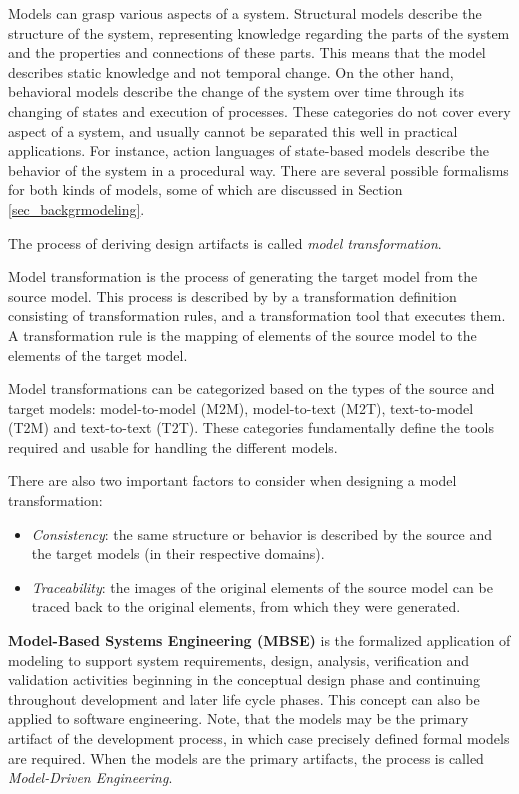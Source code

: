 Models can grasp various aspects of a system. Structural models describe the structure of the system, representing knowledge regarding the parts of the system and the properties and connections of these parts. This means that the model describes static knowledge and not temporal change. On the other hand, behavioral models describe the change of the system over time through its changing of states and execution of processes. These categories do not cover every aspect of a system, and usually cannot be separated this well in practical applications. For instance, action languages of state-based models describe the behavior of the system in a procedural way. There are several possible formalisms for both kinds of models, some of which are discussed in Section \ref{sec_backgrmodeling}.

The process of deriving design artifacts is called \textit{model transformation}.
\begin{definition}
	Model transformation is the process of generating the target model from the source model. This process is described by by a transformation definition consisting of transformation rules, and a transformation tool that executes them. A transformation rule is the mapping of elements of the source model to the elements of the target model. \cite{ModelTransformation}
\end{definition}

Model transformations can be categorized based on the types of the source and target models: model-to-model (M2M), model-to-text (M2T), text-to-model (T2M) and text-to-text (T2T). These categories fundamentally define the tools required and usable for handling the different models.

There are also two important factors to consider when designing a model transformation: 
\begin{itemize}
	\item \textit{Consistency}: the same structure or behavior is described by the source and the target models (in their respective domains).
	\item \textit{Traceability}: the images of the original elements of the source model can be traced back to the original elements, from which they were generated.
\end{itemize}

\textbf{Model-Based Systems Engineering (MBSE)} is the formalized application of modeling to support system requirements, design, analysis, verification and validation activities beginning in the conceptual design phase and continuing throughout development and later life cycle phases\cite{mbse}. This concept can also be applied to software engineering. Note, that the models may be the primary artifact of the development process, in which case precisely defined formal models are required. When the models are the primary artifacts, the process is called \textit{Model-Driven Engineering}.

